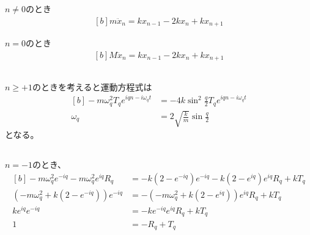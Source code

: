 \documentclass[../ap_2022.tex]{subfiles}
\begin{document}
\section{}
\subsection{}
\(n\neq 0\)のとき
\begin{equation}\begin{aligned}[b]
    m\ddot{x}_n=kx_{n-1}-2kx_n+kx_{n+1}
\end{aligned}\end{equation}

\(n=0\)のとき
\begin{equation}\begin{aligned}[b]
    M\ddot{x}_n=kx_{n-1}-2kx_n+kx_{n+1}
\end{aligned}\end{equation}

\subsection{}
\(n\geq +1\)のときを考えると運動方程式は
\begin{equation}\begin{aligned}[b]
    -m\omega_q^2T_qe^{iqn-i\omega_qt} &= -4k\sin^2\frac{q}{2}T_qe^{iqn-i\omega_qt}\\
    \omega_q &= 2\sqrt{\frac{k}{m}}\sin\frac{q}{2}
\end{aligned}\end{equation}
となる。

\subsection{}
\subsection{}
\(n=-1\)のとき、
\begin{equation}\begin{aligned}[b]
    -m\omega_q^2e^{-iq}-m\omega_q^2e^{iq}R_q &= -k(2-e^{-iq})e^{-iq}-k(2-e^{iq})e^{iq}R_q +kT_q\\
    (-m\omega_q^2+k(2-e^{-iq}))e^{-iq} &= -(-m\omega_q^2+k(2-e^{iq}))e^{iq}R_q+kT_q\\
    ke^{iq}e^{-iq} &= -ke^{-iq}e^{iq}R_q+kT_q\\
    1 &= -R_q+T_q
\end{aligned}\end{equation}
\end{document}

